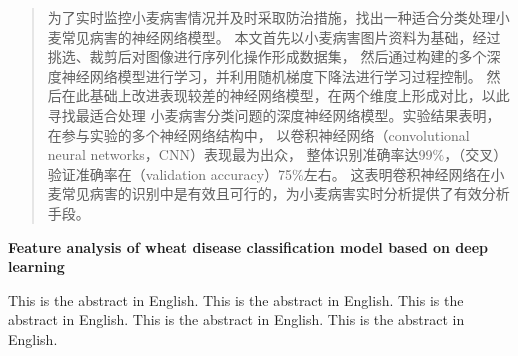 \begin{abstract}
    为了实时监控小麦病害情况并及时采取防治措施，找出一种适合分类处理小麦常见病害的神经网络模型。
    本文首先以小麦病害图片资料为基础，经过挑选、裁剪后对图像进行序列化操作形成数据集，
    然后通过构建的多个深度神经网络模型进行学习，并利用随机梯度下降法进行学习过程控制。
    然后在此基础上改进表现较差的神经网络模型，在两个维度上形成对比，以此寻找最适合处理
    小麦病害分类问题的深度神经网络模型。实验结果表明，在参与实验的多个神经网络结构中，
    以卷积神经网络（convolutional neural networks，CNN）表现最为出众，
    整体识别准确率达99\%，（交叉）验证准确率在（validation accuracy）75\%左右。
    这表明卷积神经网络在小麦常见病害的识别中是有效且可行的，为小麦病害实时分析提供了有效分析手段。

\end{abstract}
\newpage

\begin{center}
    \fontsize{18pt}{18pt}\textbf{Feature analysis of wheat disease classification model based on deep learning}
\end{center}
\begin{enabstract}
    This is the abstract in English.    This is the abstract in English.    This is the abstract in English.    This is the abstract in English.    This is the abstract in English.

\end{enabstract}
\newpage